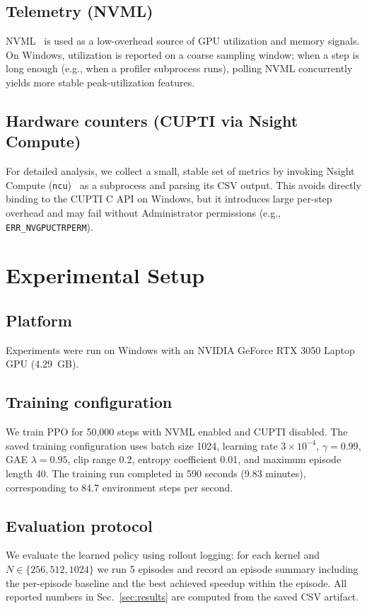 \documentclass[journal,letterpaper]{IEEEtran}
\begin{document}
\subsection{Telemetry (NVML)}
NVML~\cite{nvml} is used as a low-overhead source of GPU utilization and memory signals.
On Windows, utilization is reported on a coarse sampling window; when a step is long enough (e.g., when a profiler subprocess runs), polling NVML concurrently yields more stable peak-utilization features.

\subsection{Hardware counters (CUPTI via Nsight Compute)}
For detailed analysis, we collect a small, stable set of metrics by invoking Nsight Compute (\texttt{ncu})~\cite{nsightcompute} as a subprocess and parsing its CSV output.
This avoids directly binding to the CUPTI C API on Windows, but it introduces large per-step overhead and may fail without Administrator permissions (e.g., \texttt{ERR\_NVGPUCTRPERM}).

\section{Experimental Setup}
\label{sec:setup}

\subsection{Platform}
Experiments were run on Windows with an NVIDIA GeForce RTX 3050 Laptop GPU (4.29~GB).

\subsection{Training configuration}
We train PPO for 50{,}000 steps with NVML enabled and CUPTI disabled.
The saved training configuration uses batch size 1024, learning rate $3\times10^{-4}$, $\gamma{=}0.99$, GAE $\lambda{=}0.95$, clip range 0.2, entropy coefficient 0.01, and maximum episode length 40.
The training run completed in 590 seconds (9.83 minutes), corresponding to 84.7 environment steps per second.

\subsection{Evaluation protocol}
We evaluate the learned policy using rollout logging: for each kernel and $N\in\{256,512,1024\}$ we run 5 episodes and record an episode summary including the per-episode baseline and the best achieved speedup within the episode.
All reported numbers in Sec.~\ref{sec:results} are computed from the saved CSV artifact.
\end{document}
